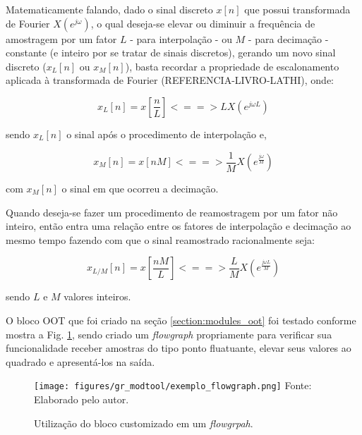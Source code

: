 \documentclass[
  12pt,				%
  openright,			%
  twoside,			%
  a4paper,			%
  english,			%
  french,				%
  spanish,			%
  brazil,				%
  ]{abntex2}
\begin{document}
Matematicamente falando, dado o sinal discreto $x[n]$ que possui transformada de Fourier $X(e^{j\omega})$, o qual deseja-se elevar ou diminuir a frequência de amostragem por um fator $L$
- para interpolação - ou $M$ - para decimação - constante (e inteiro por se tratar de sinais discretos), gerando um novo sinal discreto ($x_L[n]$ ou $x_M[n]$), basta recordar a propriedade de
escalonamento aplicada à transformada de Fourier (REFERENCIA-LIVRO-LATHI), onde:

\begin{equation*}
  x_L[n] = x[\frac{n}{L}] <==> L X(e^{j\omega L})
\end{equation*}

sendo $x_L[n]$ o sinal após o procedimento de interpolação e,

\begin{equation*}
  x_M[n] = x[nM] <==> \frac{1}{M} X(e^{\frac{j\omega}{M}})
\end{equation*}

com $x_M[n]$ o sinal em que ocorreu a decimação.

Quando deseja-se fazer um procedimento de reamostragem por um fator não inteiro, então entra uma relação entre os fatores de interpolação e decimação ao mesmo tempo fazendo com que o sinal
reamostrado racionalmente seja:

\begin{equation*}
  x_{L/M}[n] = x[\frac{nM}{L}] <==> \frac{L}{M} X(e^{\frac{j\omega L}{M}})
\end{equation*}

sendo $L$ e $M$ valores inteiros.

O bloco OOT que foi criado na seção \ref{section:modules_oot} foi testado conforme mostra a Fig. \ref{fig:exemplo_flowgraph}, sendo criado um \textit{flowgraph} propriamente para verificar
sua funcionalidade receber amostras do tipo ponto fluatuante, elevar seus valores ao quadrado e apresentá-los na saída.

\begin{figure}[!htb]
  \centering
  \caption{Utilização do bloco customizado em um \textit{flowgrpah}.}
  \texttt{[image: figures/gr\_modtool/exemplo\_flowgraph.png]}
  Fonte: Elaborado pelo autor.
  \label{fig:exemplo_flowgraph}
\end{figure}




\end{document}
